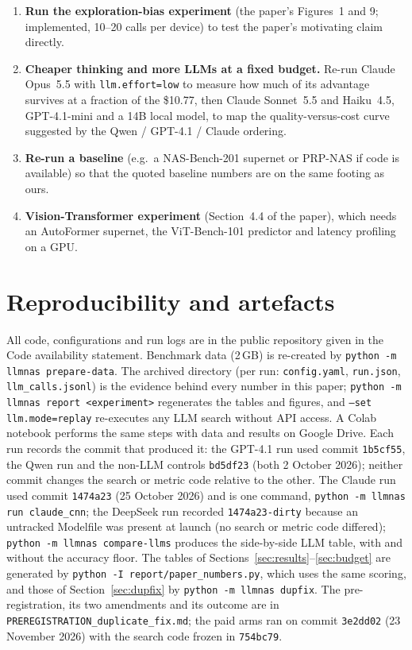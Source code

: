 \documentclass[pdflatex,sn-mathphys-num]{sn-jnl}
\newcommand{\code}[1]{\texttt{#1}}
\begin{document}
\begin{enumerate}
  \item \textbf{Run the exploration-bias experiment} (the paper's Figures~1 and 9; implemented, 10--20 calls per device) to test the paper's motivating claim directly.
  \item \textbf{Cheaper thinking and more LLMs at a fixed budget.} Re-run Claude Opus~5.5 with \code{llm.effort=low} to measure how much of its advantage survives at a fraction of the \$10.77, then Claude Sonnet~5.5 and Haiku~4.5, GPT-4.1-mini and a 14B local model, to map the quality-versus-cost curve suggested by the Qwen / GPT-4.1 / Claude ordering.
  \item \textbf{Re-run a baseline} (e.g.\ a NAS-Bench-201 supernet or PRP-NAS if code is available) so that the quoted baseline numbers are on the same footing as ours.
  \item \textbf{Vision-Transformer experiment} (Section~4.4 of the paper), which needs an AutoFormer supernet, the ViT-Bench-101 predictor and latency profiling on a GPU.
\end{enumerate}

\section{Reproducibility and artefacts}
All code, configurations and run logs are in the public repository given in the Code availability statement. Benchmark data (2\,GB) is re-created by \code{python -m llmnas prepare-data}. The archived  directory (per run: \code{config.yaml}, \code{run.json}, \code{llm\_calls.jsonl}) is the evidence behind every number in this paper; \code{python -m llmnas report <experiment>} regenerates the tables and figures, and \code{--set llm.mode=replay} re-executes any LLM search without API access. A Colab notebook performs the same steps with data and results on Google Drive. Each run records the commit that produced it: the GPT-4.1 run used commit \code{1b5cf55}, the Qwen run and the non-LLM controls \code{bd5df23} (both 2 October 2026); neither commit changes the search or metric code relative to the other. The Claude run used commit \code{1474a23} (25 October 2026) and is one command, \code{python -m llmnas run claude\_cnn}; the DeepSeek run recorded \code{1474a23-dirty} because an untracked Modelfile was present at launch (no search or metric code differed); \code{python -m llmnas compare-llms} produces the side-by-side LLM table, with and without the accuracy floor. The tables of Sections~\ref{sec:results}--\ref{sec:budget} are generated by \code{python -I report/paper\_numbers.py}, which uses the same scoring, and those of Section~\ref{sec:dupfix} by \code{python -m llmnas dupfix}. The pre-registration, its two amendments and its outcome are in \code{PREREGISTRATION\_duplicate\_fix.md}; the paid arms ran on commit \code{3e2dd02} (23 November 2026) with the search code frozen in \code{754bc79}.
\end{document}
